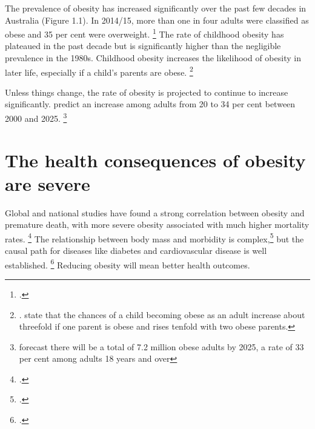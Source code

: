 \documentclass[embargoed]{grattan}
\begin{document}
The prevalence of obesity has increased significantly over the past few decades in Australia (Figure 1.1).
In 2014/15, more than one in four adults were classified as obese and 35 per cent were overweight.%
\footcite[][Tables 8 and 16]{ABS20154364055001NationalHealth} The rate of childhood obesity has plateaued in the past decade but is significantly higher than the negligible prevalence in the 1980s.
Childhood obesity increases the likelihood of obesity in later life, especially if a child's parents are obese.%
\footnote{\textcites{Health2013AustralianDietaryGuidelines}{Baker2007Childhoodbodymass}{Popkin2004nutritiontransitionworldwide}{Summerbell2005Interventionspreventingobesity}. \textcite{Sobko2011randomisedcontrolledtrial} state that the chances of a child becoming obese as an adult increase about threefold if one parent is obese and rises tenfold with two obese parents.}

Unless things change, the rate of obesity is projected to continue to increase significantly. \textcite{Walls2012Projectedprogressionprevalence} predict an increase among adults from 20 to 34 per cent between 2000 and 2025.%
\footnote{\textcite{PwC2015Weighingcostobesity} forecast there will be a total of 7.2 million obese adults by 2025, a rate of 33 per cent among adults 18 years and over}

\section{The health consequences of obesity are severe}\label{the-health-consequences-of-obesity-are-severe}

Global and national studies have found a strong correlation between obesity and premature death, with more severe obesity associated with much higher mortality rates.%
\footcites{Collaboration2016Bodymassindex}{Aune2016BMIallcause}{Flegal2013Associationallcause}{Korda2013Prospectivecohortstudy} The relationship between body mass and morbidity is complex,\footcites{Swinburn2004Dietnutritionprevention}{Livingston2012Progressobesityresearch} but the causal path for diseases like diabetes and cardiovascular disease is well established.%
\footcites{Poirier2006Obesitycardiovasculardisease}{Kritchevsky2015Intentionalweightloss}{Rueda-Clausen2015Healthbenefitslong}{Blackburn1995Effectdegreeweight} Reducing obesity will mean better health outcomes.
\end{document}
